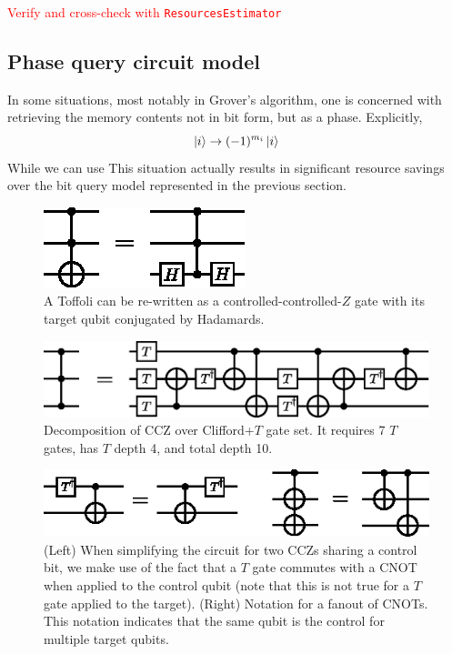 \documentclass[a4paper,12pt]{article}
\newcommand\todo[1]{\textcolor{red}{#1}}
\begin{document}
\todo{Verify and cross-check with \texttt{ResourcesEstimator}}

\subsection{Phase query circuit model}

In some situations, most notably in Grover's algorithm, one is concerned with retrieving the memory contents not in bit form, but as a phase. 
Explicitly, 
\begin{equation}
 \ket{i} \rightarrow (-1)^{m_i} \ket{i}
\end{equation}
While we can use This situation actually results in significant resource savings over the bit query model represented in the previous section. 

\begin{figure}
 \centering
 \includegraphics[scale=2]{images/ccz}
 \caption{A Toffoli can be re-written as a controlled-controlled-$Z$ gate with its target qubit conjugated by Hadamards.}
 \label{fig:ccz}
\end{figure}

\begin{figure}
 \centering
 \includegraphics[scale=0.8]{images/ccz-clifford-t}
 \caption{Decomposition of CCZ over Clifford+$T$ gate set. It requires 7 $T$ gates, has $T$ depth 4, and total depth 10.}
 \label{fig:ccz-clifford-t}
\end{figure}

\begin{figure}
 \centering
 \includegraphics[scale=2]{images/constant-bb-useful-identities}
 \caption{(Left) When simplifying the circuit for two CCZs sharing a control bit, we make use of the fact that a $T$ gate commutes with a CNOT when applied to the control qubit (note that this is not true for a $T$ gate applied to the target). (Right) Notation for a fanout of CNOTs. This notation indicates that the same qubit is the control for multiple target qubits.}
 \label{fig:bb-constant-identities}
\end{figure}
\end{document}
